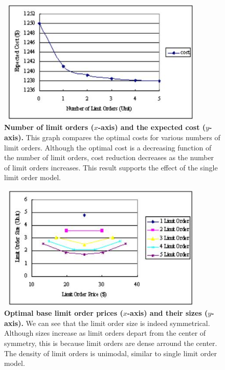 \begin{figure}[htbp]
\begin{center}
 \includegraphics[width=10cm,height=6cm]{fg_l5n.png}
\end{center}
\caption[Number of limit orders and the expected cost]
{{\bf Number of limit orders ($x$-axis) and the expected cost ($y$-axis).}
 \quad This graph compares the optimal costs for various numbers of limit orders.
 Although the optimal cost is a decreasing function of the number of limit orders, cost reduction decreases as
the number of limit orders increases.
 This result supports the effect of the single limit order model.}\label{fg_l5}
\end{figure}

\begin{figure}[htbp]
\begin{center}
 \includegraphics[width=10cm,height=6cm]{fg_l6n.png}
\end{center}
\caption[Optimal base limit order prices and their sizes]
{{\bf Optimal base limit order prices ($x$-axis) and their sizes ($y$-axis).}
 \quad We can see that the limit order size is indeed symmetrical.
 Although sizes increase as limit orders depart from the center of symmetry, this is because limit orders are
dense arround the center.
 The density of limit orders is unimodal, similar to single limit order model.}\label{fg_l6}
\end{figure}


